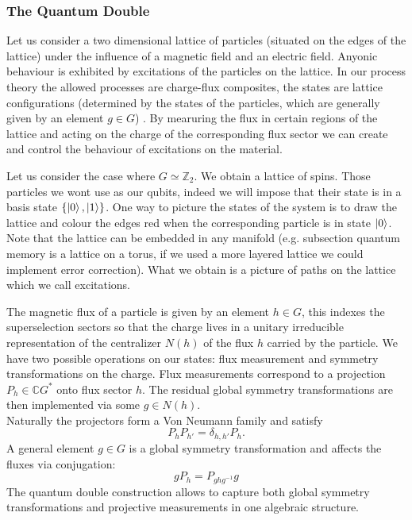 \documentclass{article}
\newenvironment{example}[1][Example]{\begin{trivlist}
\item[\hskip \labelsep {\bfseries #1}]}{\end{trivlist}}
\begin{document}
\subsubsection{The Quantum Double}
Let us consider a two dimensional lattice of particles (situated on the edges of the lattice) under the influence of a magnetic field and an electric field. Anyonic behaviour is exhibited by excitations of the particles on the lattice. In our process theory the allowed processes are charge-flux composites, the states are lattice configurations (determined by the states of the particles, which are generally given by an element $g \in G$)  . By mearuring the flux in certain regions of the lattice and acting on the charge of the corresponding flux sector we can create and control the behaviour of excitations on the material.
\begin{example}
Let us consider the case where $G \simeq \mathbb{Z}_2$. We obtain a lattice of spins. Those particles we wont use as our qubits, indeed we will impose that their state is in a basis state $\{\ket{0},\ket{1}\}$. One way to picture the states of the system is to draw the lattice and colour the edges red when the corresponding particle is in state $\ket{0}$. Note that the lattice can be embedded in any manifold (e.g. subsection quantum memory is a lattice on a torus, if we used a more layered lattice we could implement error correction). What we obtain is a picture of paths on the lattice which we call excitations.
\end{example}
The magnetic flux of a particle is given by an element $h \in G$, this indexes the superselection sectors so that the charge lives in a unitary irreducible representation of the centralizer $N(h)$ of the flux $h$ carried by the particle. We have two possible operations on our states: flux measurement and symmetry transformations on the charge. Flux measurements correspond to a projection $P_h \in \mathbb{C}G^*$ onto flux sector $h$. The residual global symmetry transformations are then implemented via some $g \in N(h)$. \\
Naturally the projectors form a Von Neumann family and satisfy 
$$P_hP_{h'}= \delta_{h,h'} P_h.$$ 
A general element $g \in G$ is a global symmetry transformation and affects the fluxes via conjugation:
\begin{equation}
gP_h = P_{ghg^{-1}}g
\end{equation}
The quantum double construction allows to capture both global symmetry transformations and projective measurements in one algebraic structure.
\end{document}
